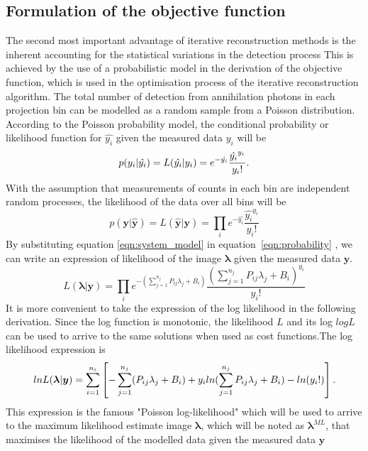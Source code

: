 \subsection{Formulation of the objective function}
The second most important advantage of iterative reconstruction methods is the inherent accounting for the statistical variations in the detection process This is achieved by the use of a probabilistic model in the derivation of the objective function, which is used in the optimisation process of the iterative reconstruction algorithm.
The total number of detection from annihilation photons in each projection bin can be modelled as a random sample from a Poisson distribution. According to the Poisson probability model, the conditional probability or likelihood function for $\hat{y_i}$ given the measured data ${y_i}$ will be
\begin{equation}
p({y_i}|{\hat{y_i}}) = L({\hat{y_i}}|{y_i}) = e^{-\hat{y_i}} \frac{\hat{y_i}^{y_i}}{{y_i}!}  \\  .
\end{equation}
With the assumption that measurements of counts in each bin are independent random processes, the likelihood of the data over all bins will be
\begin{equation}
p(\bm{y}|\bm{\hat{y}}) = L(\bm{\hat{y}}|\bm{y}) = \prod_i e^{-\hat{y_i}} \frac{\hat{y_i}^{y_i}}{{y_i}!} 
\label{eqn:probability}
\end{equation}
By substituting equation \ref{eqn:system_model} in equation~\ref{eqn:probability} , we can write an expression of likelihood of the image $\bm{\lambda}$ given the measured data $\bm{y}$.
\begin{equation}
    L(\bm{\lambda}|\bm{y})  = \prod_i e^{-(\sum_{j=1}^{n_j} P_{ij} \lambda_j + B_{i} )} \frac{(\sum_{j=1}^{n_j} P_{ij} \lambda_j + B_{i} )^{y_i}}{{y_i}!}
\end{equation}It is more convenient to take the expression of the log likelihood in the following derivation. Since the log function is monotonic, the likelihood $L$ and its log $logL$ can be used to arrive to the same solutions when used as cost functions.The log likelihood expression is
\begin{equation}
    lnL(\bm{\lambda}|\bm{y})  = \sum_{i=1}^{n_i}\left[  -\sum_{j=1}^{n_j} (P_{ij} \lambda_j + B_i) + y_i ln(\sum_{j=1}^{n_j} P_{ij} \lambda_j + B_i) - ln({y_i}!) \right] \\.
\label{eqn:log_likelihood}
\end{equation}
This expression is the famous  "Poisson log-likelihood"  which will be used to arrive to the maximum likelihood estimate image $\bm\lambda$, which will be noted as $\bm{\lambda}^{ML}$, that maximises the likelihood of the modelled data given the measured data  $\bm{y}$


